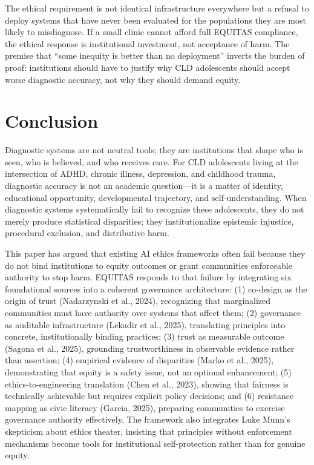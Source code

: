 \documentclass[12pt,letterpaper]{article}
\begin{document}
The ethical requirement is not identical infrastructure everywhere but a refusal to deploy systems that have never been evaluated for the populations they are most likely to misdiagnose. If a small clinic cannot afford full EQUITAS compliance, the ethical response is institutional investment, not acceptance of harm. The premise that ``some inequity is better than no deployment'' inverts the burden of proof: institutions should have to justify why CLD adolescents should accept worse diagnostic accuracy, not why they should demand equity.\cite{garcia_ed415}

\section{Conclusion}

Diagnostic systems are not neutral tools; they are institutions that shape who is seen, who is believed, and who receives care. For CLD adolescents living at the intersection of ADHD, chronic illness, depression, and childhood trauma, diagnostic accuracy is not an academic question---it is a matter of identity, educational opportunity, developmental trajectory, and self-understanding. When diagnostic systems systematically fail to recognize these adolescents, they do not merely produce statistical disparities; they institutionalize epistemic injustice, procedural exclusion, and distributive harm.\cite{garcia_ed415}

This paper has argued that existing AI ethics frameworks often fail because they do not bind institutions to equity outcomes or grant communities enforceable authority to stop harm. EQUITAS responds to that failure by integrating six foundational sources into a coherent governance architecture: (1) co-design as the origin of trust (Nadarzynski et al., 2024), recognizing that marginalized communities must have authority over systems that affect them; (2) governance as auditable infrastructure (Lekadir et al., 2025), translating principles into concrete, institutionally binding practices; (3) trust as measurable outcome (Sagona et al., 2025), grounding trustworthiness in observable evidence rather than assertion; (4) empirical evidence of disparities (Marko et al., 2025), demonstrating that equity is a safety issue, not an optional enhancement; (5) ethics-to-engineering translation (Chen et al., 2023), showing that fairness is technically achievable but requires explicit policy decisions; and (6) resistance mapping as civic literacy (Garcia, 2025), preparing communities to exercise governance authority effectively.\cite{nadarzynski2024}\cite{lekadir2025}\cite{sagona2025}\cite{marko2025}\cite{chen2023}\cite{garcia_ed415} The framework also integrates Luke Munn's skepticism about ethics theater, insisting that principles without enforcement mechanisms become tools for institutional self-protection rather than for genuine equity.\cite{munn_idai700}
\end{document}
